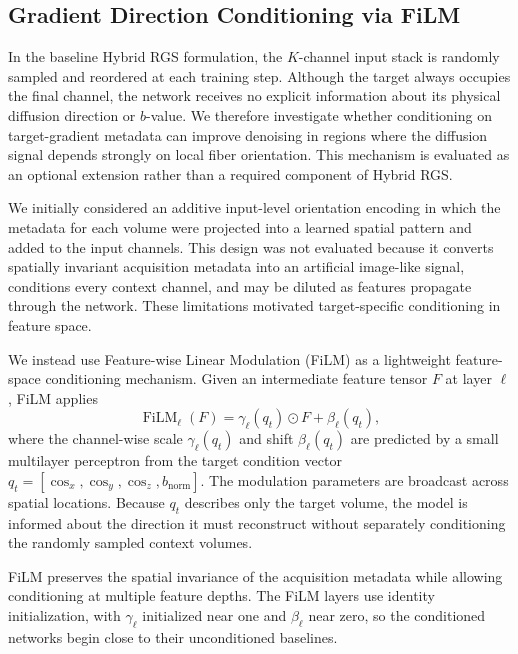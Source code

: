 \documentclass[preprint,12pt]{elsarticle}
\begin{document}
\subsection{Gradient Direction Conditioning via FiLM}
\label{subsec:film_ablation}

In the baseline Hybrid RGS formulation, the $K$-channel input stack is randomly sampled and reordered at each training step. Although the target always occupies the final channel, the network receives no explicit information about its physical diffusion direction or $b$-value. We therefore investigate whether conditioning on target-gradient metadata can improve denoising in regions where the diffusion signal depends strongly on local fiber orientation. This mechanism is evaluated as an optional extension rather than a required component of Hybrid RGS.

We initially considered an additive input-level orientation encoding in which the metadata for each volume were projected into a learned spatial pattern and added to the input channels. This design was not evaluated because it converts spatially invariant acquisition metadata into an artificial image-like signal, conditions every context channel, and may be diluted as features propagate through the network. These limitations motivated target-specific conditioning in feature space.

We instead use Feature-wise Linear Modulation (FiLM) \cite{perez2018film} as a lightweight feature-space conditioning mechanism. Given an intermediate feature tensor $F$ at layer $\ell$, FiLM applies
\begin{equation}
  \operatorname{FiLM}_\ell(F) = \gamma_\ell(q_t) \odot F + \beta_\ell(q_t),
  \label{eq:film}
\end{equation}
where the channel-wise scale $\gamma_\ell(q_t)$ and shift $\beta_\ell(q_t)$ are predicted by a small multilayer perceptron from the target condition vector $q_t=[\cos_x,\cos_y,\cos_z,b_{\mathrm{norm}}]$. The modulation parameters are broadcast across spatial locations. Because $q_t$ describes only the target volume, the model is informed about the direction it must reconstruct without separately conditioning the randomly sampled context volumes.

FiLM preserves the spatial invariance of the acquisition metadata while allowing conditioning at multiple feature depths. The FiLM layers use identity initialization, with $\gamma_\ell$ initialized near one and $\beta_\ell$ near zero, so the conditioned networks begin close to their unconditioned baselines.
\end{document}
